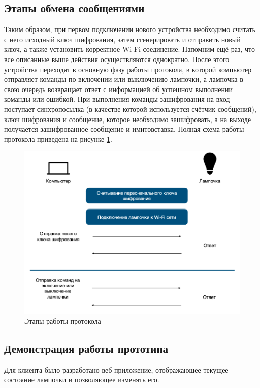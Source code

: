 	\subsection{Этапы обмена сообщениями}
	
	Таким образом, при первом подключении нового устройства необходимо считать с него исходный ключ
	шифрования, затем сгенерировать и отправить новый ключ, а также установить корректное Wi-Fi
	соединение. Напомним ещё раз, что все описанные выше действия осуществляются однократно. После
	этого устройства переходят в основную фазу работы протокола, в которой компьютер отправляет команды
	по включении или выключению лампочки, а лампочка в свою очередь возвращает ответ с информацией
	об успешном выполнении команды или ошибкой. При выполнения команды зашифрования на вход поступает
	синхропосылка (в качестве которой используется счётчик сообщений), ключ шифрования и сообщение,
	которое необходимо зашифровать, а на выходе получается зашифрованное сообщение и имитовставка.
	Полная схема работы протокола приведена на рисунке \ref{fig4.5}.
	
	\begin{figure}[h]
		\centering
		\includegraphics[scale=0.5]{resources/work-scheme}
		\caption{Этапы работы протокола}
		\label{fig4.5}
	\end{figure}
	
	\subsection{Демонстрация работы прототипа}
	
	Для клиента было разработано веб-приложение, отображающее текущее состояние лампочки и позволяющее
	изменять его.
	
